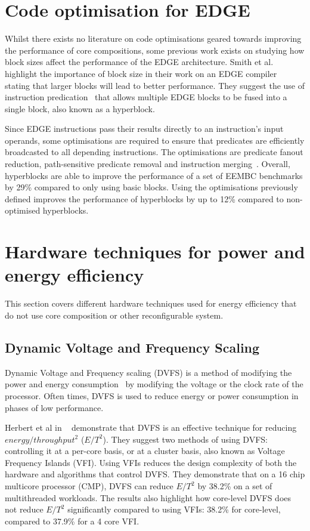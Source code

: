 \section{Code optimisation for EDGE}

Whilst there exists no literature on code optimisations geared towards improving the performance of core compositions, some previous work exists on studying how block sizes affect the performance of the EDGE architecture.
Smith et al. highlight the importance of block size in their work on an EDGE compiler ~\cite{smith2006edge} stating that larger blocks will lead to better performance.
They suggest the use of instruction predication~\cite{smith2006dataflowpred} that allows multiple EDGE blocks to be fused into a single block, also known as a hyperblock.

Since EDGE instructions pass their results directly to an instruction's input operands, some optimisations are required to ensure that predicates are efficiently broadcasted to all depending instructions.
The optimisations are predicate fanout reduction, path-sensitive predicate removal and instruction merging~\cite{smith2006dataflowpred}.
Overall, hyperblocks are able to improve the performance of a set of EEMBC benchmarks by 29\% compared to only using basic blocks.
Using the optimisations previously defined improves the performance of hyperblocks by up to 12\% compared to non-optimised hyperblocks.


\section{Hardware techniques for power and energy efficiency}

This section covers different hardware techniques used for energy efficiency that do not use core composition or other reconfigurable system.

\subsection{Dynamic Voltage and Frequency Scaling}
Dynamic Voltage and Frequency scaling (DVFS) is a method of modifying the power and energy consumption~\cite{paganiEECHM2017} by modifying the voltage or the clock rate of the processor.
Often times, DVFS is used to reduce energy or power consumption in phases of low performance.

Herbert et al in ~\cite{herbertDVFS07} demonstrate that DVFS is an effective technique for reducing $energy/throughput^2$ ($E/T^2$).
They suggest two methods of using DVFS: controlling it at a per-core basis, or at a cluster basis, also known as Voltage Frequency Islands (VFI).
Using VFIs reduces the design complexity of both the hardware and algorithms that control DVFS.
They demonstrate that on a 16 chip multicore processor (CMP), DVFS can reduce $E/T^2$ by 38.2\% on a set of multithreaded workloads.
The results also highlight how core-level DVFS does not reduce $E/T^2$ significantly compared to using VFIs: 38.2\% for core-level, compared to 37.9\% for a 4 core VFI.

